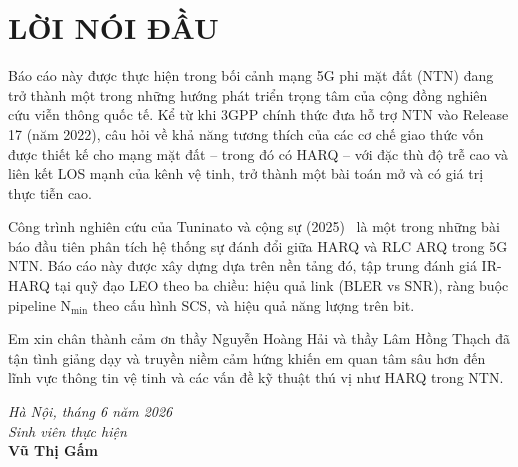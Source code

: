 \section*{LỜI NÓI ĐẦU}

Báo cáo này được thực hiện trong bối cảnh mạng 5G phi mặt đất (NTN) đang trở thành một trong những hướng phát triển trọng tâm của cộng đồng nghiên cứu viễn thông quốc tế. Kể từ khi 3GPP chính thức đưa hỗ trợ NTN vào Release 17 (năm 2022), câu hỏi về khả năng tương thích của các cơ chế giao thức vốn được thiết kế cho mạng mặt đất -- trong đó có HARQ -- với đặc thù độ trễ cao và liên kết LOS mạnh của kênh vệ tinh, trở thành một bài toán mở và có giá trị thực tiễn cao.

Công trình nghiên cứu của Tuninato và cộng sự (2025)~\cite{tuninato2025} là một trong những bài báo đầu tiên phân tích hệ thống sự đánh đổi giữa HARQ và RLC ARQ trong 5G NTN. Báo cáo này được xây dựng dựa trên nền tảng đó, tập trung đánh giá IR-HARQ tại quỹ đạo LEO theo ba chiều: hiệu quả link (BLER vs SNR), ràng buộc pipeline N$_{\min}$ theo cấu hình SCS, và hiệu quả năng lượng trên bit.

Em xin chân thành cảm ơn thầy Nguyễn Hoàng Hải và thầy Lâm Hồng Thạch đã tận tình giảng dạy và truyền niềm cảm hứng khiến em quan tâm sâu hơn đến lĩnh vực thông tin vệ tinh và các vấn đề kỹ thuật thú vị như HARQ trong NTN.

\vspace{12pt}
\begin{flushright}
\textit{Hà Nội, tháng 6 năm 2026}\\
\textit{Sinh viên thực hiện}\\
\vspace{24pt}
\textbf{Vũ Thị Gấm}
\end{flushright}
\cleardoublepage
